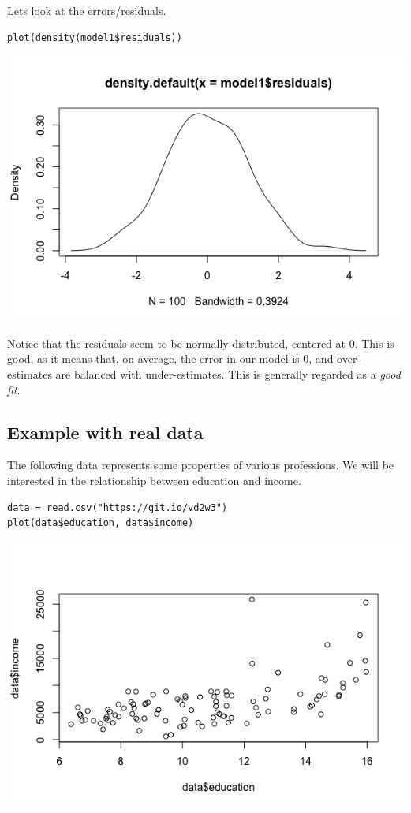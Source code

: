 \documentclass[11pt]{article}
\begin{document}
Lets look at the errors/residuals. 

\begin{verbatim}
plot(density(model1$residuals))
\end{verbatim}

\includegraphics[width=.9\linewidth]{figures/week7/residuals.png}

Notice that the residuals seem to be normally distributed, centered at 0.  This is good, as it means that, on average, the error in our model is 0, and over-estimates are balanced with under-estimates.  This is generally regarded as a \emph{good fit}.

\subsection*{Example with real data}
\label{sec-4-1}

The following data represents some properties of various professions.  We will be interested in the relationship between education and income.

\begin{verbatim}
data = read.csv("https://git.io/vd2w3")
plot(data$education, data$income)
\end{verbatim}

\includegraphics[width=.9\linewidth]{figures/week7/incomePlot.png}
\end{document}
